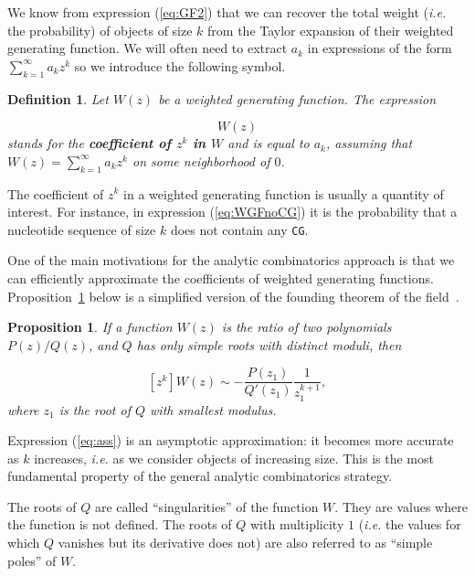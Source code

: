 \documentclass{article}
\newtheorem{definition}{Definition}
\newtheorem{proposition}{Proposition}
\begin{document}
We know from expression (\ref{eq:GF2}) that we can recover the total
weight (\textit{i.e.} the probability) of objects of size $k$ from the
Taylor expansion of their weighted generating function. We will often need
to extract $a_k$ in expressions of the form $\sum_{k=1}^\infty a_k z^k$ so
we introduce the following symbol.

\begin{definition}
Let $W(z)$ be a weighted generating function. The expression

\begin{equation*}
[z^k]W(z)
\end{equation*}
stands for the \textbf{coefficient of $z^k$ in $W$} and is equal to $a_k$,
assuming that $W(z) = \sum_{k=1}^\infty a_k z^k$ on some neighborhood of
$0$.
\end{definition}

The coefficient of $z^k$ in a weighted generating function is usually a
quantity of interest. For instance, in expression (\ref{eq:WGFnoCG}) it
is the probability that a nucleotide sequence of size $k$ does not contain
any \texttt{CG}.

One of the main motivations for the analytic combinatorics approach is
that we can efficiently approximate the coefficients of weighted
generating functions. Proposition~\ref{th:ass} below is a simplified
version of the founding theorem of the
field~\cite{flajolet1990singularity}.


\begin{proposition}
\label{th:ass}
If a function $W(z)$ is the ratio of two polynomials $P(z)/Q(z)$, and $Q$
has only simple roots with distinct \textit{moduli}, then

\begin{equation}
\label{eq:ass}
[z^k]W(z) \sim
-\frac{P(z_1)}{Q'(z_1)}\frac{1}{z_1^{k+1}},
\end{equation}
where $z_1$ is the root of $Q$ with smallest \textit{modulus}.
\end{proposition}

Expression (\ref{eq:ass}) is an asymptotic approximation: it becomes more
accurate as $k$ increases, \textit{i.e.} as we consider objects of
increasing size. This is the most fundamental property of the general
analytic combinatorics strategy.

The roots of $Q$ are called ``singularities'' of the function $W$. They
are values where the function is not defined. The roots of $Q$ with
multiplicity $1$ (\textit{i.e.} the values for which $Q$ vanishes but its
derivative does not) are also referred to as ``simple poles'' of $W$.
\end{document}
